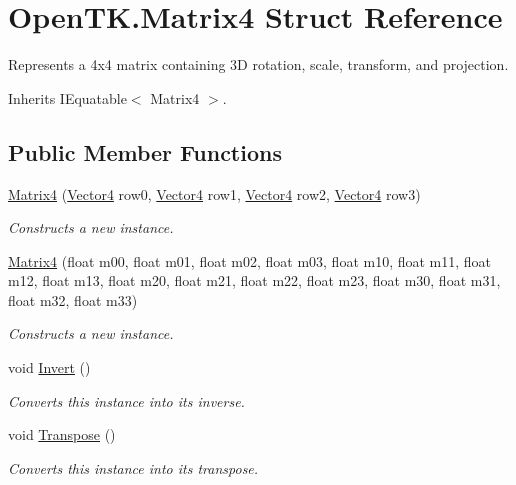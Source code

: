 \hypertarget{struct_open_t_k_1_1_matrix4}{\section{Open\-T\-K.\-Matrix4 Struct Reference}
\label{struct_open_t_k_1_1_matrix4}
}


Represents a 4x4 matrix containing 3\-D rotation, scale, transform, and projection.  




Inherits I\-Equatable$<$ Matrix4 $>$.

\subsection*{Public Member Functions}
\begin{DoxyCompactItemize}
\item 
\hyperlink{struct_open_t_k_1_1_matrix4_a49b9829498b26bc8f6201a443a7d2b14}{Matrix4} (\hyperlink{struct_open_t_k_1_1_vector4}{Vector4} row0, \hyperlink{struct_open_t_k_1_1_vector4}{Vector4} row1, \hyperlink{struct_open_t_k_1_1_vector4}{Vector4} row2, \hyperlink{struct_open_t_k_1_1_vector4}{Vector4} row3)
\begin{DoxyCompactList}\small\item\em Constructs a new instance. \end{DoxyCompactList}\item 
\hyperlink{struct_open_t_k_1_1_matrix4_a2a4340045fcdb95abd2554f236696bc0}{Matrix4} (float m00, float m01, float m02, float m03, float m10, float m11, float m12, float m13, float m20, float m21, float m22, float m23, float m30, float m31, float m32, float m33)
\begin{DoxyCompactList}\small\item\em Constructs a new instance. \end{DoxyCompactList}\item 
void \hyperlink{struct_open_t_k_1_1_matrix4_a8ea1070e8b49605a0fad0a5b557b6f0d}{Invert} ()
\begin{DoxyCompactList}\small\item\em Converts this instance into its inverse. \end{DoxyCompactList}\item 
void \hyperlink{struct_open_t_k_1_1_matrix4_a28595e56298b6ca8c2c7268e0e8ba160}{Transpose} ()
\begin{DoxyCompactList}\small\item\em Converts this instance into its transpose. \end{DoxyCompactList}\item 

\end{DoxyCompactItemize}
